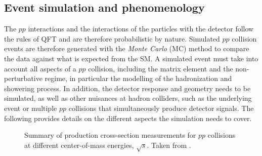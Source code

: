 \subsection{Event simulation and phenomenology}
\label{subsec:event-simulation}


The $pp$ interactions and the interactions of the particles with the detector follow the rules of QFT and are therefore probabilistic by nature.
Simulated $pp$ collision events are therefore generated with the \emph{Monte Carlo} (MC) method to compare the data against what is expected from the SM.
A simulated event must take into account all aspects of a $pp$ collision, including the matrix element and the non-perturbative regime, in particular the modelling of the hadronization and showering process. In addition, the detector response and geometry needs to be simulated, as well as other nuisances at hadron colliders, such as the underlying event or multiple $pp$ collisions that simultaneously produce detector signals.
The following provides details on the different aspects the simulation needs to cover.

\begin{figure}[t]
  \caption[Summary of production cross-sections measurements for $pp$ collisions at different center-of-mass energy.]{
    Summary of production cross-section measurements for $pp$ collisions at different center-of-mass energies, $\sqrt{s}$. Taken from .
    }
  \label{fig:xsec}
\end{figure}

